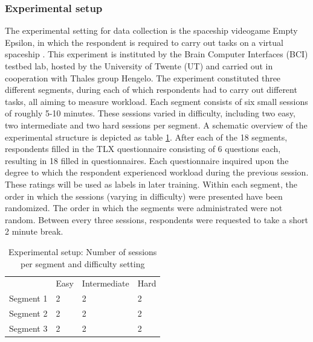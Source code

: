 \documentclass[12pt]{article}
\begin{document}
\subsubsection{Experimental setup}
The experimental setting for data collection is the spaceship videogame Empty Epsilon, in which the respondent is required to carry out tasks on a virtual spaceship \cite{daid2016empty}. This experiment is instituted by the Brain Computer Interfaces (BCI) testbed lab, hosted by the University of Twente (UT) and carried out in cooperation with Thales group Hengelo. The experiment constituted three different segments, during each of which respondents had to carry out different tasks, all aiming to measure workload. Each segment consists of six small sessions of roughly 5-10 minutes. These sessions varied in difficulty, including two easy, two intermediate and two hard sessions per segment. A schematic overview of the experimental structure is depicted as table \ref{table:expsetup}. After each of the 18 segments, respondents filled in the TLX questionnaire consisting of 6 questions each, resulting in 18 filled in questionnaires. Each questionnaire inquired upon the degree to which the respondent experienced workload during the previous session. These ratings will be used as labels in later training. Within each segment, the order in which the sessions (varying in difficulty) were presented have been randomized. The order in which the segments were administrated were not random. Between every three sessions, respondents were requested to take a short 2 minute break.
\bigskip
\bgroup
\def\arraystretch{1.6}%
\begin{table}[h]
\centering
\caption{Experimental setup: Number of sessions per segment and difficulty setting}
\label{table:expsetup}
\begin{tabular}{llll}
                               & Easy                   & Intermediate           & Hard                   \\ \cline{2-4} 
\multicolumn{1}{l|}{Segment 1} & \multicolumn{1}{l|}{2} & \multicolumn{1}{l|}{2} & \multicolumn{1}{l|}{2} \\ \cline{2-4} 
\multicolumn{1}{l|}{Segment 2} & \multicolumn{1}{l|}{2} & \multicolumn{1}{l|}{2} & \multicolumn{1}{l|}{2} \\ \cline{2-4} 
\multicolumn{1}{l|}{Segment 3} & \multicolumn{1}{l|}{2} & \multicolumn{1}{l|}{2} & \multicolumn{1}{l|}{2} \\ \cline{2-4} 
\end{tabular}
\end{table}
\egroup
\bigskip 
\end{document}
